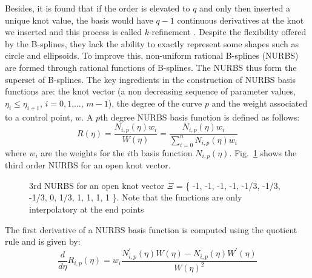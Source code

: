 Besides, it is found that if the order is elevated to $q$ and only then inserted a unique knot value, the basis would have $q-1$ continuous derivatives at the knot we inserted and this process is called $k$-refinement \citep{Hug2005b}.
Despite the flexibility offered by the B-splines, they lack the ability to exactly represent some shapes such as circle and ellipsoids.
To improve this, non-uniform rational B-splines (NURBS) are formed through rational functions of B-splines.
The NURBS thus form the superset of B-splines.
The key ingredients in the construction of NURBS basis functions are: the knot vector (a non decreasing sequence of parameter values, $\eta_i \leq \eta_{i+1}$, $i=0,1$,$\dots$, $m-1$), the degree of the curve $p$ and the weight associated to a control point, $w$.
A $p$th degree NURBS basis function is defined as follows:
\begin{equation}
    R(\eta) =   \frac{ N_{i,p}(\eta) w_i }{W(\eta)}
            =   \frac{ N_{i,p}(\eta) w_i }{
                    \sum_{i=0}^{n} N_{i,p}(\eta)w_i
                }
\label{iso_eq:rational_basis_function}
\end{equation}
where $w_i$ are the weights for the $i$th basis function $N_{i,p}(\eta)$.
Fig.~\ref{lr_fig:nurbs_rational_basis} shows the third order NURBS for an open knot vector.

\begin{figure}
    \centering
    \caption{3rd NURBS for an open knot vector $\Xi$ = \{ -1, -1, -1, -1, -1/3, -1/3, -1/3, 0, 1/3, 1, 1, 1, 1 \}. Note that the functions are only interpolatory at the end points}
    \label{lr_fig:nurbs_rational_basis}
\end{figure}

The first derivative of a NURBS basis function is computed using the quotient rule and is given by:
\begin{equation}
    \frac{d}{d\eta}R_{i,p}(\eta) =  w_i\frac{
        N^\prime_{i,p}(\eta)W(\eta) - N_{i,p}(\eta) W^\prime(\eta)
    }{W(\eta)^2}
\end{equation}